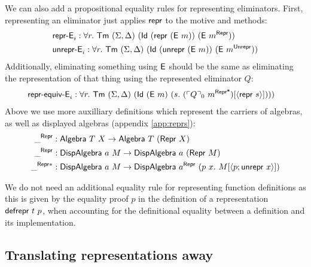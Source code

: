 We can also add a propositional equality rules for representing eliminators.
First, representing an eliminator just applies $\textsf{repr}$ to the motive and methods:
\begin{align*}
&\mta{repr-E}_i : \forall r.\ \Tm\ (\Sigma, \Delta)\ (\mta{Id}\ (\Mrepr\ (\mta{E}\ m))\ (\mta{E}\ m^\mta{Repr})) \\
&\mta{unrepr-E}_i : \forall r.\ \Tm\ (\Sigma, \Delta)\ (\mta{Id}\ (\Munrepr\ (\mta{E}\ m))\ (\mta{E}\ m^\mta{Unrepr}))
\end{align*}
Additionally, eliminating something using $\textsf{E}$ should be the same as
eliminating the representation of that thing using the represented eliminator $Q$:
\begin{align*}
&\mta{repr-equiv-E}_i : \forall r.\ \Tm\ (\Sigma, \Delta)\ (\mta{Id}\ (\mta{E}\ m)\ (s.\ (\emb{Q}_0\ m^{\mta{Repr*}})[\Msub{\mta{repr}\ s}])))
\end{align*}
Above we use more auxilliary definitions which represent the carriers of
algebras, as well as displayed algebras (appendix \cref{app:reprs}):
\begin{align*}
\_^{\mta{Repr}} &: \mta{Algebra}\ T\ X \to \mta{Algebra}\ T\ (\mta{Repr}\ X) \\
 \_^{\mta{Repr}} &: \mta{DispAlgebra}\ a\ M \to \mta{DispAlgebra}\ a\ (\MRepr\ M) \\
 \_^{\mta{Repr}*} &: \mta{DispAlgebra}\ a\ M \to \mta{DispAlgebra}\ a^{\mta{Repr}}\ (p\ x .\ M[\Msub{p;\mta{unrepr}\ x}])
\end{align*}

We do not need an additional equality rule for representing function definitions
as this is given by the equality proof $p$ in the definition of a
representation $\textsf{defrepr}\ t\ p$, when accounting for the definitional
equality between a definition and its implementation.

\subsection{Translating representations away}

